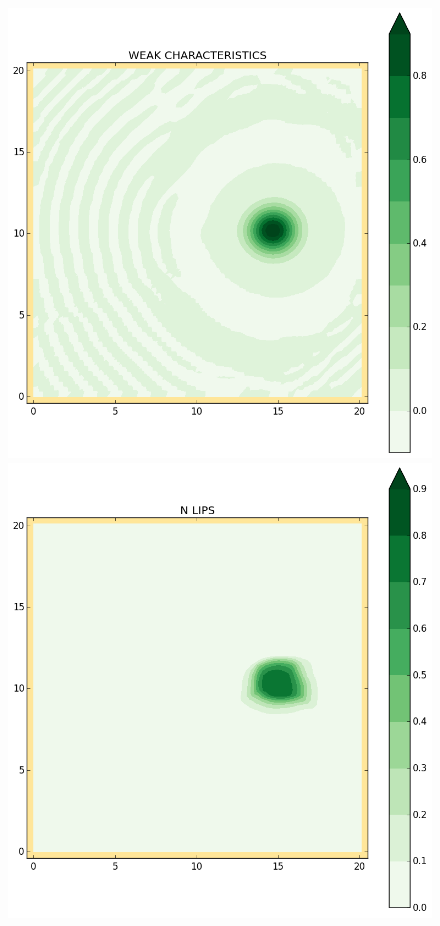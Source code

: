 \begin{figure}[h!]
\begin{minipage}[t]{0.50\textwidth}
 \includegraphics[trim=19mm 19mm 35mm 21mm,clip,scale=0.28]{../img/figure_WC.png}
\end{minipage}
\begin{minipage}[t]{0.50\textwidth}
 \centering
 \includegraphics[trim=19mm 19mm 35mm 21mm,clip,scale=0.28]{../img/figure_LIN.png}

\end{minipage}
\end{figure}
